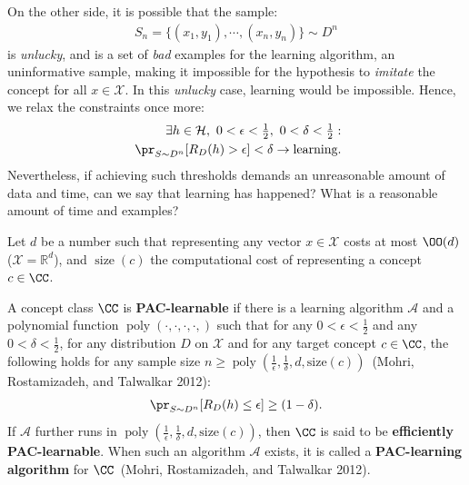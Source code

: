 \documentclass[
  letterpaper,
  12pt,
  british]{tufte-book}
\theoremstyle{plain}
\theoremstyle{definition}
\theoremstyle{plain}
\theoremstyle{remark}
\begin{document}
On the other side, it is possible that the sample: \begin{align}
    S_n = \{(\mathit{x}_1,\mathit{y}_1), \cdots, (\mathit{x}_n, \mathit{y}_n)\} \sim D^n
\end{align} is \emph{unlucky}, and is a set of \emph{bad} examples for
the learning algorithm, an uninformative sample, making it impossible
for the hypothesis to \emph{imitate} the concept for all
\(\mathit{x}\in \mathcal{X}\). In this \emph{unlucky} case, learning
would be impossible. Hence, we relax the constraints once more:
\begin{align}
    \exists h \in \mathcal{H}, ~0 < \epsilon < \tfrac{1}{2}, ~0 < \delta < \tfrac{1}{2}: \nonumber\\
    ~\pr_{S \sim D^n}[R_{D}(h) > \epsilon] < \delta \to \text{learning}.
\end{align} Nevertheless, if achieving such thresholds demands an
unreasonable amount of data and time, can we say that learning has
happened? What is a reasonable amount of time and examples?

Let \(d\) be a number such that representing any vector
\(\mathit{x}\in \mathcal{X}\) costs at most \(\OO(d)\)
(\(\mathcal{X}= \mathbb{R}^d\)), and \(\operatorname{size}(c)\) the
computational cost of representing a concept \(c \in \CC\).

A concept class \(\CC\) is \textbf{PAC-learnable} if there is a learning
algorithm \(\mathcal{A}\) and a polynomial function
\(\operatorname{poly}(\cdot,\cdot, \cdot, \cdot, )\) such that for any
\(0< \epsilon < \tfrac{1}{2}\) and any \(0< \delta < \tfrac{1}{2}\), for
any distribution \(D\) on \(\mathcal{X}\) and for any target concept
\(c \in \CC\), the following holds for any sample size
\(n \geq \operatorname{poly}(\tfrac{1}{\epsilon}, \tfrac{1}{\delta}, d, \text{size}(c))\)~(Mohri,
Rostamizadeh, and Talwalkar
2012):
\begin{align}
        \pr_{S \sim D^n}[R_{D}(h) \leq \epsilon] \geq (1 - \delta).
\end{align} If \(\mathcal{A}\) further runs in
\(\operatorname{poly}(\tfrac{1}{\epsilon}, \tfrac{1}{\delta}, d, \text{size}(c))\),
then \(\CC\) is said to be \textbf{efficiently PAC-learnable}. When such
an algorithm \(\mathcal{A}\) exists, it is called a \textbf{PAC-learning
algorithm} for \(\CC\)~(Mohri, Rostamizadeh, and Talwalkar
2012).
\end{document}
